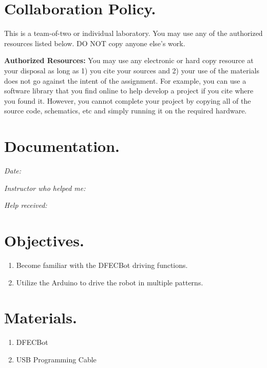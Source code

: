 \documentclass{handout}
\begin{document}
	\maketitle
	
	\section{Collaboration Policy.}
	This is a team-of-two or individual laboratory. You may use any of the authorized resources listed below. DO NOT copy anyone else’s work.
	
	\textbf{Authorized Resources:} You may use any electronic or hard copy resource at your disposal as long as 1) you cite your sources and 2) your use of the materials does not go against the intent of the assignment. For example, you can use a software library that you find online to help develop a project if you cite where you found it. However, you cannot complete your project by copying all of the source code, schematics, etc and simply running it on the required hardware.
	
	\section{Documentation.}
	\textit{Date:}
	
	\textit{Instructor who helped me:}
	
	\textit{Help received:}
	
	\section{Objectives.} 
	\begin{enumerate}
		\item Become familiar with the DFECBot driving functions.
		\item Utilize the Arduino to drive the robot in multiple patterns.
	\end{enumerate}
	
	\section{Materials.}
	\begin{enumerate}
		\item DFECBot
		\item USB Programming Cable
	\end{enumerate}
	
\end{document}
